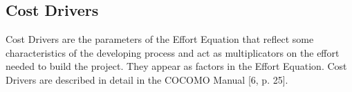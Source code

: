 \subsection{Cost Drivers}
Cost Drivers are the parameters of the Effort Equation that reflect some characteristics of the developing process and act as multiplicators on the effort needed to build the project. They appear as factors in the Effort Equation. Cost Drivers are described in detail in the COCOMO Manual [6, p. 25].
